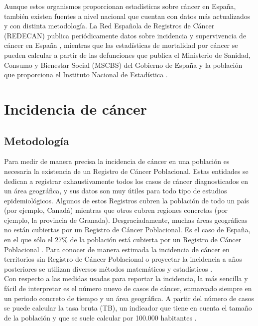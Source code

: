 Aunque estos organismos proporcionan estadísticas sobre cáncer en España, también existen fuentes a nivel nacional que cuentan con datos más actualizados y con distinta metodología. La Red Española de Registros de Cáncer (REDECAN) publica periódicamente datos sobre incidencia y supervivencia de cáncer en España \cite{REDECAN2020, Guevara2019}, mientras que las estadísticas de mortalidad por cáncer se pueden calcular a partir de las defunciones que publica el Ministerio de Sanidad, Consumo y Bienestar Social (MSCBS) del Gobierno de España \cite{MSCBS} y la población que proporciona el Instituto Nacional de Estadística \cite{INEpob}.


\section{Incidencia de cáncer}

\subsection{Metodología}

Para medir de manera precisa la incidencia de cáncer en una población es necesaria la existencia de un Registro de Cáncer Poblacional. Estas entidades se dedican a registrar exhaustivamente todos los casos de cáncer diagnosticados en un área geográfica, y sus datos son muy útiles para todo tipo de estudios epidemiológicos. Algunos de estos Registros cubren la población de todo un país (por ejemplo, Canadá) mientras que otros cubren regiones concretas (por ejemplo, la provincia de Granada). Desgraciadamente, muchas áreas geográficas no están cubiertas por un Registro de Cáncer Poblacional. Es el caso de España, en el que sólo el 27\% de la población está cubierta por un Registro de Cáncer Poblacional \cite{Redondo-Sanchez2019}. Para conocer de manera estimada la incidencia de cáncer en territorios sin Registro de Cáncer Poblacional o proyectar la incidencia a años posteriores se utilizan diversos métodos matemáticos y estadísticos \cite{Bray2018, GCO, ECIS, ECIS2, REDECAN2020, Redondo-Sanchez2019}.\\

Con respecto a las medidas usadas para reportar la incidencia, la más sencilla y fácil de interpretar es el número nuevo de casos de cáncer, enmarcado siempre en un periodo concreto de tiempo y un área geográfica. A partir del número de casos se puede calcular la tasa bruta (TB), un indicador que tiene en cuenta el tamaño de la población y que se suele calcular por 100.000 habitantes \cite{IARC1995}.\\

